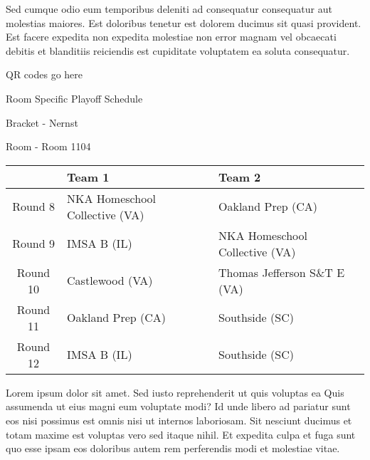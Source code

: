 \documentclass{article}%
\begin{document}
\newline%
Sed cumque odio eum temporibus deleniti ad consequatur consequatur aut molestias maiores. Est doloribus tenetur est dolorem ducimus sit quasi provident. Est facere expedita non expedita molestiae non error magnam vel obcaecati debitis et blanditiis reiciendis est cupiditate voluptatem ea soluta consequatur.%
\vspace*{140pt}%
\begin{center}%
\begin{Huge}%
QR codes go here%
\end{Huge}%
\end{center}%
\newpage%
\begin{center}%
\begin{Huge}%
Room Specific Playoff Schedule%
\end{Huge}%
\vspace*{8pt}%
\linebreak%
\begin{Large}%
Bracket {-} Nernst%
\end{Large}%
\vspace*{8pt}%
\linebreak%
\vspace*{8pt}%
\begin{Large}%
Room {-} Room 1104%
\end{Large}%
\end{center}%
%
\begin{tabularx}{\textwidth}{|c|Y|Y|}%
\hline%
&Team 1&Team 2\\%
\hline%
Round 8&NKA Homeschool Collective (VA)&Oakland Prep (CA)\\%
Round 9&IMSA B (IL)&NKA Homeschool Collective (VA)\\%
Round 10&Castlewood (VA)&Thomas Jefferson S\&T E (VA)\\%
Round 11&Oakland Prep (CA)&Southside (SC)\\%
Round 12&IMSA B (IL)&Southside (SC)\\%
\hline%
\end{tabularx}%
\vspace*{8pt}%
\newline%
Lorem ipsum dolor sit amet. Sed iusto reprehenderit ut quis voluptas ea Quis assumenda ut eius magni eum voluptate modi? Id unde libero ad pariatur sunt eos nisi possimus est omnis nisi ut internos laboriosam. Sit nesciunt ducimus et totam maxime est voluptas vero sed itaque nihil. Et expedita culpa et fuga sunt quo esse ipsam eos doloribus autem rem perferendis modi et molestiae vitae.\newline%
\end{document}
